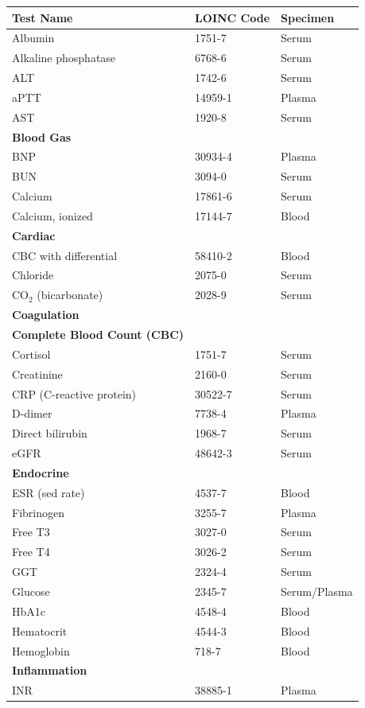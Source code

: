 \begin{longtable}{@{}lll@{}}
\toprule
\textbf{Test Name} & \textbf{LOINC Code} & \textbf{Specimen} \\
\midrule
\endhead
Albumin & 1751-7 & Serum \\
Alkaline phosphatase & 6768-6 & Serum \\
ALT & 1742-6 & Serum \\
aPTT & 14959-1 & Plasma \\
AST & 1920-8 & Serum \\
\textbf{Blood Gas} & & \\
BNP & 30934-4 & Plasma \\
BUN & 3094-0 & Serum \\
Calcium & 17861-6 & Serum \\
Calcium, ionized & 17144-7 & Blood \\
\textbf{Cardiac} & & \\
CBC with differential & 58410-2 & Blood \\
Chloride & 2075-0 & Serum \\
CO$_2$ (bicarbonate) & 2028-9 & Serum \\
\textbf{Coagulation} & & \\
\textbf{Complete Blood Count (CBC)} & & \\
Cortisol & 1751-7 & Serum \\
Creatinine & 2160-0 & Serum \\
CRP (C-reactive protein) & 30522-7 & Serum \\
D-dimer & 7738-4 & Plasma \\
Direct bilirubin & 1968-7 & Serum \\
eGFR & 48642-3 & Serum \\
\textbf{Endocrine} & & \\
ESR (sed rate) & 4537-7 & Blood \\
Fibrinogen & 3255-7 & Plasma \\
Free T3 & 3027-0 & Serum \\
Free T4 & 3026-2 & Serum \\
GGT & 2324-4 & Serum \\
Glucose & 2345-7 & Serum/Plasma \\
HbA1c & 4548-4 & Blood \\
Hematocrit & 4544-3 & Blood \\
Hemoglobin & 718-7 & Blood \\
\textbf{Inflammation} & & \\
INR & 38885-1 & Plasma \\

\end{longtable}

